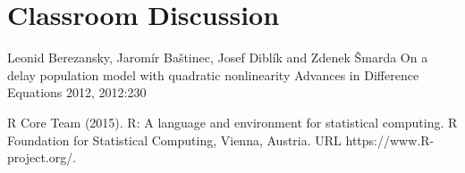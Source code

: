 \documentclass[preprint, 8pt]{elsarticle}
\theoremstyle{definition}
\begin{document}
\section{Classroom Discussion}


\begin{thebibliography}{00}
\footnotesize	

 Leonid Berezansky, Jaromír Baštinec, Josef Diblík and Zdenek Šmarda
\newblock On a delay population model with quadratic nonlinearity 
\newblock Advances in Difference Equations 2012, 2012:230

R Core Team (2015). 
\newblock R: A language and environment for statistical computing. R Foundation for Statistical Computing, Vienna, Austria.
\newblock URL https://www.R-project.org/.		

\end{thebibliography}
\end{document}
